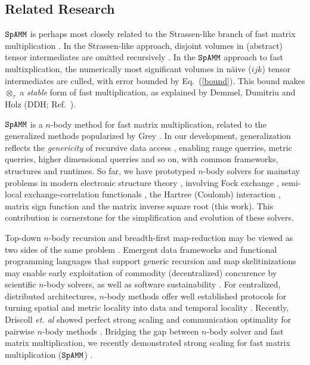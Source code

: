 \documentclass[letterpaper,twocolumn,amsmath,amsfont,amssymb,english,aps,jcp,preprintnumbers,groupaddress,nofootinbib,tightenlines,floatfix]{revtex4}
\newcommand{\ot}{  {\scriptstyle \otimes}_{ \tau } }
\theoremstyle{plain}
\theoremstyle{remark}
\theoremstyle{plain}
\begin{document}
\subsection{Related Research} 

$\tt SpAMM$ is perhaps most closely related to the Strassen-like branch of fast matrix multiplication 
\cite{springerlink:10.1007/BF02165411,Ballard2014}.
In the Strassen-like approach, disjoint volumes in (abstract) tensor intermediates are omitted recursively \cite{}.  
In the $\tt SpAMM$ approach to fast multixplication, the numerically most significant volumes in 
 n\"{a}ive ($ijk$) tensor intermediates are culled, with error bounded by Eq.~(\ref{bound}).  
This bound makes $\ot$ a {\em stable} form of fast multiplication,  as explained by Demmel, Dumitriu and Holz (DDH; Ref.~\cite{Demmel07}).

$\tt SpAMM$ is a $n$-body method for fast matrix multiplication, related to the 
generalized methods popularized by Grey \cite{Gray2001,Gray2003}. In our development,
generalization reflects the {\em genericity} \cite{} of recursive data access \cite{}, 
enabling range querries, metric querries, higher dimensional querries and so on, with common frameworks, 
structures and runtimes.  So far, we have prototyped $n$-body solvers for mainstay problems in modern electronic structure theory 
\cite{ostlundszabo, wyang}, 
involving Fock exchange \cite{}, semi-local exchange-correlation functionals \cite{}, 
the Hartree (Coulomb) interaction \cite{}, matrix sign function \cite{} and the matrix inverse square root (this work).
This contribution is cornerstone for the simplification and evolution of these solvers.  

Top-down $n$-body recursion and breadth-first map-reduction may be viewed as two sides of 
the same problem \cite{Aluru}.  Emergent data frameworks and 
functional programming languages that support generic recursion and map skelitinizations may enable 
early exploitation of commodity (decentralized) concurence by scientific $n$-body solvers, 
as well as software sustainability \cite{softwaresustainanbilty}.
For centralized, distributed architectures, $n$-body methods offer well established protocols for turning spatial and metric locality into 
data and temporal locality \cite{}.  Recently, Driscoll {\em et. al} showed perfect strong scaling and communication optimality 
for pairwise $n$-body methods \cite{Driscoll13}.   Bridging the gap between 
$n$-body solver and fast matrix multiplication, we recently demonstrated strong scaling for fast matrix multiplication ($\tt SpAMM$) \cite{}.  
\end{document}
